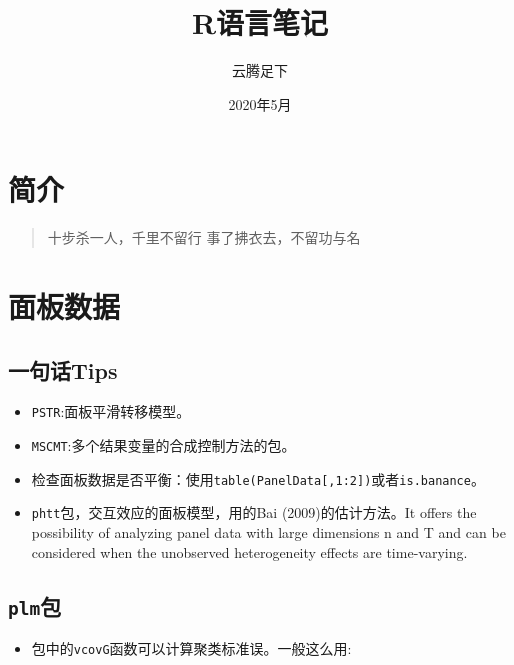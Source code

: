 \documentclass[
]{book}
\title{R语言笔记}
\author{云腾足下}
\date{2020年5月}
\providecommand{\tightlist}{%
  \setlength{\itemsep}{0pt}\setlength{\parskip}{0pt}}
\begin{document}
\maketitle

{
\setcounter{tocdepth}{1}
\tableofcontents
}
\hypertarget{ux7b80ux4ecb}{%
\chapter*{简介}\label{ux7b80ux4ecb}}

\begin{quote}
十步杀一人，千里不留行
事了拂衣去，不留功与名
\end{quote}

\hypertarget{PanelData}{%
\chapter{面板数据}\label{PanelData}}

\hypertarget{ux4e00ux53e5ux8bddtips}{%
\section{一句话Tips}\label{ux4e00ux53e5ux8bddtips}}

\begin{itemize}
\tightlist
\item
  \texttt{PSTR}:面板平滑转移模型。
\item
  \texttt{MSCMT}:多个结果变量的合成控制方法的包。
\item
  检查面板数据是否平衡：使用\texttt{table(PanelData{[},1:2{]})}或者\texttt{is.banance}。
\item
  \texttt{phtt}包，交互效应的面板模型，用的Bai (2009)的估计方法。It offers the possibility of analyzing panel data with large dimensions n and T and can be considered when the unobserved heterogeneity effects are time-varying.
\end{itemize}

\hypertarget{plmux5305}{%
\section{\texorpdfstring{\texttt{plm}包}{plm包}}\label{plmux5305}}

\begin{itemize}
\tightlist
\item
  包中的\texttt{vcovG}函数可以计算聚类标准误。一般这么用:
\end{itemize}
\end{document}
